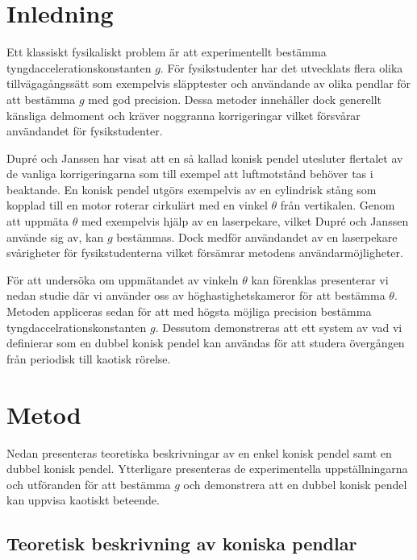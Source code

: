 \documentclass[12pt,a4paper]{article}
\begin{document}
\newpage

\tableofcontents
\newpage


\section{Inledning}
Ett klassiskt fysikaliskt problem är att experimentellt bestämma tyngdaccelerationskonstanten $g$. För fysikstudenter har det utvecklats flera olika tillvägagångssätt som exempelvis släpptester \cite{boll} och användande av olika pendlar \cite{kater} för att bestämma $g$ med god precision. Dessa metoder innehåller dock generellt känsliga delmoment och kräver noggranna korrigeringar vilket försvårar användandet för fysikstudenter.

Dupré och Janssen \cite{dupre} har visat att en så kallad konisk pendel utesluter flertalet av de vanliga korrigeringarna som till exempel att luftmotstånd behöver tas i beaktande. En konisk pendel utgörs exempelvis av en cylindrisk stång som kopplad till en motor roterar cirkulärt med en vinkel $\theta$ från vertikalen. Genom att uppmäta $\theta$ med exempelvis hjälp av en laserpekare, vilket Dupré och Janssen använde sig av, kan $g$ bestämmas. Dock medför användandet av en laserpekare svårigheter för fysikstudenterna vilket försämrar metodens användarmöjligheter.

För att undersöka om uppmätandet av vinkeln $\theta$ kan förenklas presenterar vi nedan studie där vi använder oss av höghastighetskameror för att bestämma $\theta$. Metoden appliceras sedan för att med högsta möjliga precision bestämma tyngdaccelrationskonstanten $g$. Dessutom demonstreras att ett system av vad vi definierar som en dubbel konisk pendel kan användas för att studera övergången från periodisk till kaotisk rörelse.


\section{Metod}

Nedan presenteras teoretiska beskrivningar av en enkel konisk pendel samt en dubbel konisk pendel. Ytterligare presenteras de experimentella uppställningarna och utföranden för att bestämma $g$ och demonstrera att en dubbel konisk pendel kan uppvisa kaotiskt beteende. 

\subsection{Teoretisk beskrivning av koniska pendlar}
\end{document}

